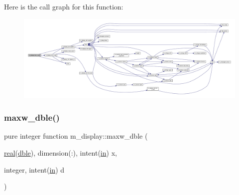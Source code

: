Here is the call graph for this function\+:
\nopagebreak
\begin{figure}[H]
\begin{center}
\leavevmode
\includegraphics[width=350pt]{namespacem__display_a7b573fb0cba7c7c954a820cdfe1c7968_cgraph}
\end{center}
\end{figure}
\mbox{\label{namespacem__display_a40bc69658b0fa714777f4b2b5477ee83}} 
\subsubsection{\texorpdfstring{maxw\+\_\+dble()}{maxw\_dble()}}
{\footnotesize\ttfamily pure integer function m\+\_\+display\+::maxw\+\_\+dble (\begin{DoxyParamCaption}\item[{\hyperlink{read__watch_83_8txt_abdb62bde002f38ef75f810d3a905a823}{real}(\hyperlink{namespacem__display_a46d90b75b6ccef7ccade133e5847e815}{dble}), dimension(\+:), intent(\hyperlink{M__journal_83_8txt_afce72651d1eed785a2132bee863b2f38}{in})}]{x,  }\item[{integer, intent(\hyperlink{M__journal_83_8txt_afce72651d1eed785a2132bee863b2f38}{in})}]{d }\end{DoxyParamCaption})\hspace{0.3cm}{\ttfamily [private]}}

